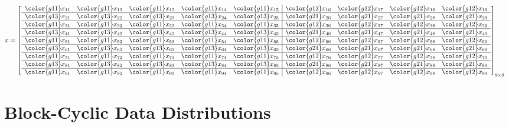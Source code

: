 \begin{align*}
x &= \left[
      \begin{array}{lllll|llll}
      \color{g11}x_{11} & \color{g11}x_{12} & \color{g11}x_{13} & \color{g11}x_{14} & \color{g11}x_{15} & \color{g12}x_{16} & \color{g12}x_{17} & \color{g12}x_{18} & \color{g12}x_{19}\\\hline
      \color{g13}x_{21} & \color{g13}x_{22} & \color{g13}x_{23} & \color{g13}x_{24} & \color{g13}x_{25} & \color{g21}x_{26} & \color{g21}x_{27} & \color{g21}x_{28} & \color{g21}x_{29}\\\hline
      \color{g11}x_{31} & \color{g11}x_{32} & \color{g11}x_{33} & \color{g11}x_{34} & \color{g11}x_{35} & \color{g12}x_{36} & \color{g12}x_{37} & \color{g12}x_{38} & \color{g12}x_{39}\\\hline
      \color{g13}x_{41} & \color{g13}x_{42} & \color{g13}x_{43} & \color{g13}x_{44} & \color{g13}x_{45} & \color{g21}x_{46} & \color{g21}x_{47} & \color{g21}x_{48} & \color{g21}x_{49}\\\hline
      \color{g11}x_{51} & \color{g11}x_{52} & \color{g11}x_{53} & \color{g11}x_{54} & \color{g11}x_{55} & \color{g12}x_{56} & \color{g12}x_{57} & \color{g12}x_{58} & \color{g12}x_{59}\\\hline
      \color{g13}x_{61} & \color{g13}x_{62} & \color{g13}x_{63} & \color{g13}x_{64} & \color{g13}x_{65} & \color{g21}x_{66} & \color{g21}x_{67} & \color{g21}x_{68} & \color{g21}x_{69}\\\hline
      \color{g11}x_{71} & \color{g11}x_{72} & \color{g11}x_{73} & \color{g11}x_{74} & \color{g11}x_{75} & \color{g12}x_{76} & \color{g12}x_{77} & \color{g12}x_{78} & \color{g12}x_{79}\\\hline
      \color{g13}x_{81} & \color{g13}x_{82} & \color{g13}x_{83} & \color{g13}x_{84} & \color{g13}x_{85} & \color{g21}x_{86} & \color{g21}x_{87} & \color{g21}x_{88} & \color{g21}x_{89}\\\hline
      \color{g11}x_{91} & \color{g11}x_{92} & \color{g11}x_{93} & \color{g11}x_{94} & \color{g11}x_{95} & \color{g12}x_{96} & \color{g12}x_{97} & \color{g12}x_{98} & \color{g12}x_{99}\\
      \end{array}
\right]_{9\times 9}
\end{align*}










\section{Block-Cyclic Data Distributions}

